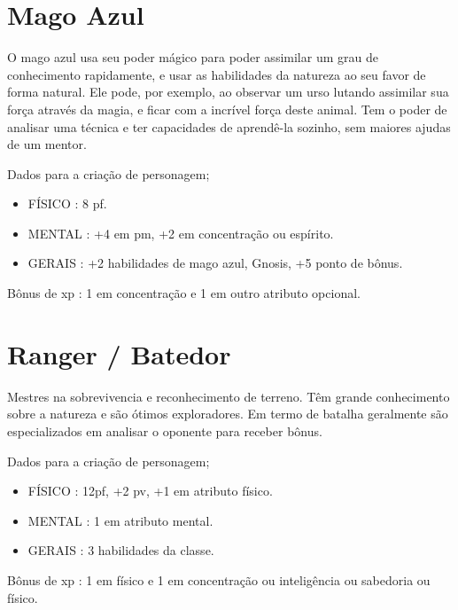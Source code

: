 \section{Mago Azul}

O mago azul usa seu poder mágico para poder assimilar um grau de conhecimento rapidamente, e usar as habilidades da natureza ao seu favor de forma natural. Ele pode, por exemplo, ao observar um urso lutando assimilar sua força através da magia, e ficar com a incrível força deste animal. Tem o poder de analisar uma técnica e ter capacidades de aprendê-la sozinho, sem maiores ajudas de um mentor.

Dados para a criação de personagem;

\begin{itemize}

	\item FÍSICO : 8 pf.

	\item MENTAL : +4 em pm, +2 em concentração ou espírito.

	\item GERAIS : +2 habilidades de mago azul, Gnosis, +5 ponto de bônus.

\end{itemize}

Bônus de xp : 1 em concentração e 1 em outro atributo opcional.

\section{Ranger / Batedor}

Mestres na sobrevivencia e reconhecimento de terreno. Têm grande conhecimento sobre a natureza e são ótimos exploradores. Em termo de batalha geralmente são especializados em analisar o oponente para receber bônus.
 

Dados para a criação de personagem;

\begin{itemize}


	\item FÍSICO : 12pf, +2 pv, +1 em atributo físico.

	\item MENTAL : 1 em atributo mental.

	\item GERAIS : 3 habilidades da classe.

\end{itemize}

Bônus de xp : 1 em físico e 1 em concentração ou inteligência ou sabedoria ou físico.

